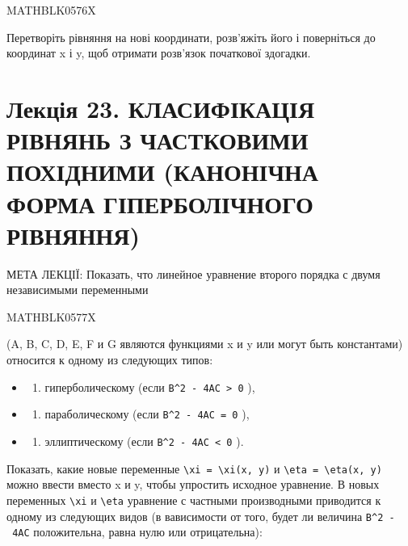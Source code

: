 \documentclass[
  ukrainian,
]{article}
\providecommand{\tightlist}{%
  \setlength{\itemsep}{0pt}\setlength{\parskip}{0pt}}
\begin{document}
MATHBLK0576X

Перетворіть рівняння на нові координати, розв'яжіть його і поверніться
до координат x і y, щоб отримати розв'язок початкової здогадки.

\section{Лекція 23. КЛАСИФІКАЦІЯ РІВНЯНЬ З ЧАСТКОВИМИ ПОХІДНИМИ
(КАНОНІЧНА ФОРМА ГІПЕРБОЛІЧНОГО
РІВНЯННЯ)}\label{ux43bux435ux43aux446ux456ux44f-23.-ux43aux43bux430ux441ux438ux444ux456ux43aux430ux446ux456ux44f-ux440ux456ux432ux43dux44fux43dux44c-ux437-ux447ux430ux441ux442ux43aux43eux432ux438ux43cux438-ux43fux43eux445ux456ux434ux43dux438ux43cux438-ux43aux430ux43dux43eux43dux456ux447ux43dux430-ux444ux43eux440ux43cux430-ux433ux456ux43fux435ux440ux431ux43eux43bux456ux447ux43dux43eux433ux43e-ux440ux456ux432ux43dux44fux43dux43dux44f}

МЕТА ЛЕКЦІЇ: Показать, что линейное уравнение второго порядка с двумя
независимыми переменными

MATHBLK0577X

(A, B, C, D, E, F и G являются функциями x и y или могут быть
константами) относится к одному из следующих типов:

\begin{itemize}
\tightlist
\item
  \begin{enumerate}
  \def\labelenumi{\arabic{enumi})}
  \tightlist
  \item
    гиперболическому (если \texttt{B\^{}2\ -\ 4AC\ \textgreater{}\ 0} ),
  \end{enumerate}
\item
  \begin{enumerate}
  \def\labelenumi{\arabic{enumi})}
  \setcounter{enumi}{1}
  \tightlist
  \item
    параболическому (если \texttt{B\^{}2\ -\ 4AC\ =\ 0} ),
  \end{enumerate}
\item
  \begin{enumerate}
  \def\labelenumi{\arabic{enumi})}
  \setcounter{enumi}{2}
  \tightlist
  \item
    эллиптическому (если \texttt{B\^{}2\ -\ 4AC\ \textless{}\ 0} ).
  \end{enumerate}
\end{itemize}

Показать, какие новые переменные
\texttt{\textbackslash{}xi\ =\ \textbackslash{}xi(x,\ y)} и
\texttt{\textbackslash{}eta\ =\ \textbackslash{}eta(x,\ y)} можно ввести
вместо x и y, чтобы упростить исходное уравнение. В новых переменных
\texttt{\textbackslash{}xi} и \texttt{\textbackslash{}eta} уравнение с
частными производными приводится к одному из следующих видов (в
вависимости от того, будет ли величина \texttt{B\^{}2\ -\ 4AC}
положительна, равна нулю или отрицательна):
\end{document}
